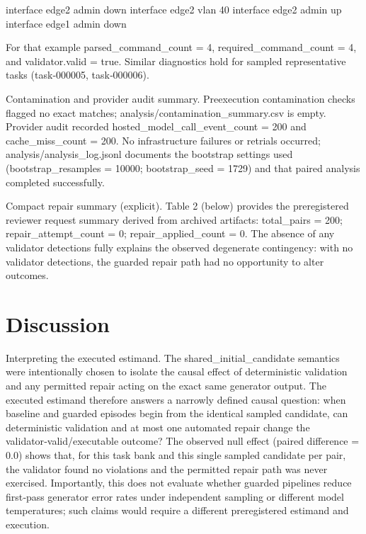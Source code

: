 \documentclass[conference]{IEEEtran}
\begin{document}
interface edge2 admin down
interface edge2 vlan 40
interface edge2 admin up
interface edge1 admin down

For that example parsed\_command\_count = 4, required\_command\_count = 4, and validator.valid = true. Similar diagnostics hold for sampled representative tasks (task‑000005, task‑000006).

Contamination and provider audit summary. Preexecution contamination checks flagged no exact matches; analysis/contamination\_summary.csv is empty. Provider audit recorded hosted\_model\_call\_event\_count = 200 and cache\_miss\_count = 200. No infrastructure failures or retrials occurred; analysis/analysis\_log.jsonl documents the bootstrap settings used (bootstrap\_resamples = 10000; bootstrap\_seed = 1729) and that paired analysis completed successfully.

Compact repair summary (explicit). Table 2 (below) provides the preregistered reviewer request summary derived from archived artifacts: total\_pairs = 200; repair\_attempt\_count = 0; repair\_applied\_count = 0. The absence of any validator detections fully explains the observed degenerate contingency: with no validator detections, the guarded repair path had no opportunity to alter outcomes.

\section{Discussion}
Interpreting the executed estimand. The shared\_initial\_candidate semantics were intentionally chosen to isolate the causal effect of deterministic validation and any permitted repair acting on the exact same generator output. The executed estimand therefore answers a narrowly defined causal question: when baseline and guarded episodes begin from the identical sampled candidate, can deterministic validation and at most one automated repair change the validator‑valid/executable outcome? The observed null effect (paired difference = 0.0) shows that, for this task bank and this single sampled candidate per pair, the validator found no violations and the permitted repair path was never exercised. Importantly, this does not evaluate whether guarded pipelines reduce first‑pass generator error rates under independent sampling or different model temperatures; such claims would require a different preregistered estimand and execution.
\end{document}
